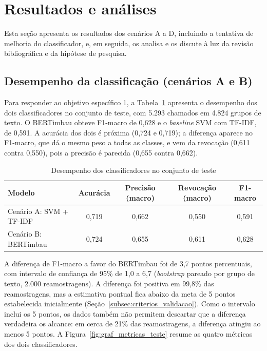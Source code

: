 \documentclass[
    12pt,                %
    openright,           %
    oneside,             %
    a4paper,             %
    english,             %
    brazil               %
]{abntex2}
\let\legendoriginal\legend
\renewcommand{\legend}[1]{\legendoriginal{\small #1}}
\begin{document}
\section{Resultados e análises}
\label{sec:resultados}

Esta seção apresenta os resultados dos cenários A a D, incluindo a tentativa de melhoria do classificador, e, em seguida, os analisa e os discute à luz da revisão bibliográfica e da hipótese de pesquisa.

\subsection{Desempenho da classificação (cenários A e B)}
\label{subsec:res_classificacao}

Para responder ao objetivo específico 1, a Tabela~\ref{tab:res_teste} apresenta o desempenho dos dois classificadores no conjunto de teste, com 5.293 chamados em 4.824 grupos de texto. O BERTimbau obteve F1-macro de 0,628 e o \textit{baseline} SVM com TF-IDF, de 0,591. A acurácia dos dois é próxima (0,724 e 0,719); a diferença aparece no F1-macro, que dá o mesmo peso a todas as classes, e vem da revocação (0,611 contra 0,550), pois a precisão é parecida (0,655 contra 0,662).

\begin{table}[htb]
  \centering
  \caption{Desempenho dos classificadores no conjunto de teste}
  \label{tab:res_teste}
  \small
  \setlength{\tabcolsep}{4pt}
  \begin{tabular}{lcccc}
    \toprule
    Modelo & Acurácia & Precisão (macro) & Revocação (macro) & F1-macro \\
    \midrule
    Cenário A: SVM + TF-IDF & 0,719 & 0,662 & 0,550 & 0,591 \\
    Cenário B: BERTimbau & 0,724 & 0,655 & 0,611 & 0,628 \\
    \bottomrule
  \end{tabular}
  \legend{Fonte: Elaborado pelos autores.}
\end{table}

A diferença de F1-macro a favor do BERTimbau foi de 3,7 pontos percentuais, com intervalo de confiança de 95\% de 1,0 a 6,7 (\textit{bootstrap} pareado por grupo de texto, 2.000 reamostragens). A diferença foi positiva em 99,8\% das reamostragens, mas a estimativa pontual fica abaixo da meta de 5 pontos estabelecida inicialmente (Seção~\ref{subsec:criterios_validacao}). Como o intervalo inclui os 5 pontos, os dados também não permitem descartar que a diferença verdadeira os alcance: em cerca de 21\% das reamostragens, a diferença atingiu ao menos 5 pontos. A Figura~\ref{fig:graf_metricas_teste} resume as quatro métricas dos dois classificadores.
\end{document}
